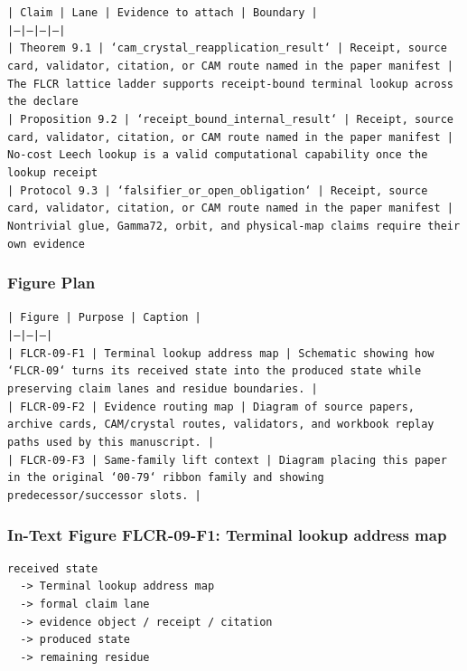 \documentclass[11pt]{article}
\begin{document}
\noindent\texttt{| Claim | Lane | Evidence to attach | Boundary |}\\
\noindent\texttt{|---|---|---|---|}\\
\noindent\texttt{| Theorem 9.1 | `cam\_crystal\_reapplication\_result` | Receipt, source card, validator, citation, or CAM route named in the paper manifest | The FLCR lattice ladder supports receipt-bound terminal lookup across the declare}\\
\noindent\texttt{| Proposition 9.2 | `receipt\_bound\_internal\_result` | Receipt, source card, validator, citation, or CAM route named in the paper manifest | No-cost Leech lookup is a valid computational capability once the lookup receipt}\\
\noindent\texttt{| Protocol 9.3 | `falsifier\_or\_open\_obligation` | Receipt, source card, validator, citation, or CAM route named in the paper manifest | Nontrivial glue, Gamma72, orbit, and physical-map claims require their own evidence }\\

\subsubsection*{Figure Plan}

\noindent\texttt{| Figure | Purpose | Caption |}\\
\noindent\texttt{|---|---|---|}\\
\noindent\texttt{| FLCR-09-F1 | Terminal lookup address map | Schematic showing how `FLCR-09` turns its received state into the produced state while preserving claim lanes and residue boundaries. |}\\
\noindent\texttt{| FLCR-09-F2 | Evidence routing map | Diagram of source papers, archive cards, CAM/crystal routes, validators, and workbook replay paths used by this manuscript. |}\\
\noindent\texttt{| FLCR-09-F3 | Same-family lift context | Diagram placing this paper in the original `00-79` ribbon family and showing predecessor/successor slots. |}\\

\subsubsection*{In-Text Figure FLCR-09-F1: Terminal lookup address map}

\begin{verbatim}
received state
  -> Terminal lookup address map
  -> formal claim lane
  -> evidence object / receipt / citation
  -> produced state
  -> remaining residue
\end{verbatim}
\end{document}
